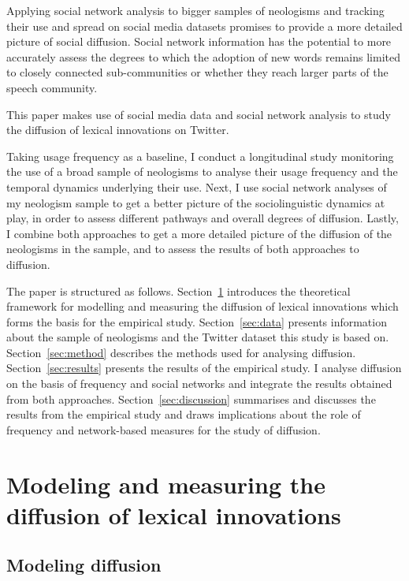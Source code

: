 \documentclass[
  a4paper,
  abstract=on,
  captions=tableabove
  ]{scrartcl}
\begin{document}
Applying social network analysis to bigger samples of neologisms and tracking their use and spread on social media datasets promises to provide a more detailed picture of social diffusion. Social network information has the potential to more accurately assess the degrees to which the adoption of new words remains limited to closely connected sub-communities or whether they reach larger parts of the speech community.

This paper makes use of social media data and social network analysis to study the diffusion of lexical innovations on Twitter.

Taking usage frequency as a baseline, I conduct a longitudinal study monitoring the use of a broad sample of neologisms to analyse their usage frequency and the temporal dynamics underlying their use. Next, I use social network analyses of my neologism sample to get a better picture of the sociolinguistic dynamics at play, in order to assess different pathways and overall degrees of diffusion. Lastly, I combine both approaches to get a more detailed picture of the diffusion of the neologisms in the sample, and to assess the results of both approaches to diffusion.

The paper is structured as follows. Section~\ref{sec:model-measure-diff} introduces the theoretical framework for modelling and measuring the diffusion of lexical innovations which forms the basis for the empirical study. Section~\ref{sec:data} presents information about the sample of neologisms and the Twitter dataset this study is based on. Section~\ref{sec:method} describes the methods used for analysing diffusion. Section~\ref{sec:results} presents the results of the empirical study. I analyse diffusion on the basis of frequency and social networks and integrate the results obtained from both approaches. Section~\ref{sec:discussion} summarises and discusses the results from the empirical study and draws implications about the role of frequency and network-based measures for the study of diffusion.


\section{Modeling and measuring the diffusion of lexical innovations}
  \label{sec:model-measure-diff}


  \subsection{Modeling diffusion}
\end{document}
